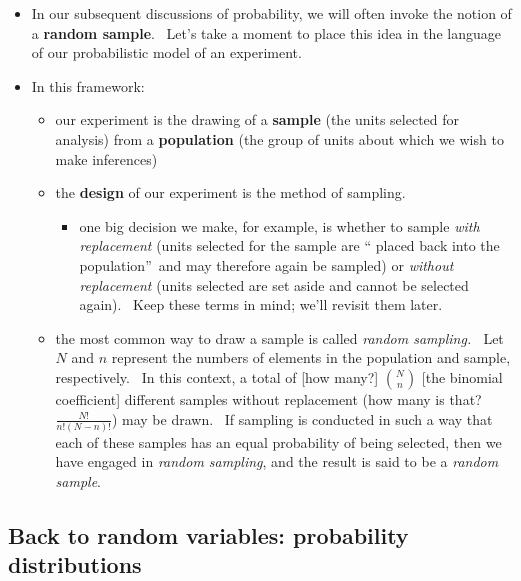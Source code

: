 \documentclass[11pt]{article}
\begin{document}
\begin{itemize}
\item In our subsequent discussions of probability, we will often invoke the
notion of a \textbf{random sample}. \ Let's take a moment to place this idea
in the language of our probabilistic model of an experiment.

\item In this framework:

\begin{itemize}
\item our experiment is the drawing of a \textbf{sample }(the units selected
for analysis) from a \textbf{population} (the group of units about which we
wish to make inferences)

\item the \textbf{design }of our experiment is the method of sampling.

\begin{itemize}
\item one big decision we make, for example, is whether to sample \textit{%
with replacement }(units selected for the sample are \textquotedblleft
placed back into the population\textquotedblright\ and may therefore again
be sampled) or \textit{without replacement} (units selected are set aside
and cannot be selected again). \ Keep these terms in mind; we'll revisit
them later.
\end{itemize}

\item the most common way to draw a sample is called \textit{random
sampling. \ }Let $N$ and $n$ represent the numbers of elements in the
population and sample, respectively. \ In this context, a total of [how
many?] $\binom{N}{n}$ [the binomial coefficient] different samples without
replacement (how many is that? $\frac{N!}{n!\left( N-n\right) !}$) may be
drawn. \ If sampling is conducted in such a way that each of these samples
has an equal probability of being selected, then we have engaged in \textit{%
random sampling}, and the result is said to be a \textit{random sample}.
\end{itemize}
\end{itemize}

\subsection{Back to random variables: probability distributions}
\end{document}
